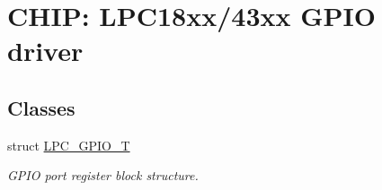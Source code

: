 \hypertarget{group___g_p_i_o__18_x_x__43_x_x}{}\section{C\+H\+IP\+: L\+P\+C18xx/43xx G\+P\+IO driver}
\label{group___g_p_i_o__18_x_x__43_x_x}
\subsection*{Classes}
\begin{DoxyCompactItemize}
\item 
struct \hyperlink{struct_l_p_c___g_p_i_o___t}{L\+P\+C\+\_\+\+G\+P\+I\+O\+\_\+T}
\begin{DoxyCompactList}\small\item\em G\+P\+IO port register block structure. \end{DoxyCompactList}\end{DoxyCompactItemize}
